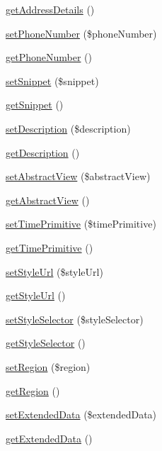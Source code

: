 \begin{DoxyCompactItemize}
\item 
\hyperlink{classFeature_af1d451696fc5849c4a76ad583b6774c7}{getAddressDetails} ()
\item 
\hyperlink{classFeature_a25bd3bce01d5d4a5de52140bf21b6598}{setPhoneNumber} (\$phoneNumber)
\item 
\hyperlink{classFeature_ab3231780035528bf1f5d7a045f7a96e2}{getPhoneNumber} ()
\item 
\hyperlink{classFeature_ae4eab7a245ddbe6af1308a4887cd33ea}{setSnippet} (\$snippet)
\item 
\hyperlink{classFeature_a0b572f137dd3c6b2eeabcc09f0058848}{getSnippet} ()
\item 
\hyperlink{classFeature_a15e69cacfe59295974cf7bda19eb3052}{setDescription} (\$description)
\item 
\hyperlink{classFeature_a72e22a8b110daba84cab1e06ff69da73}{getDescription} ()
\item 
\hyperlink{classFeature_a2a972193bb4117515513b30f99ce46ca}{setAbstractView} (\$abstractView)
\item 
\hyperlink{classFeature_a288e654dce20d49aa7d0dd59fae9eb28}{getAbstractView} ()
\item 
\hyperlink{classFeature_a379553d80ee9fce1742d89c6b6929b24}{setTimePrimitive} (\$timePrimitive)
\item 
\hyperlink{classFeature_a415c99cc750f96183bdfeae7b245b4c7}{getTimePrimitive} ()
\item 
\hyperlink{classFeature_a192d44bc9a22166cc2288dd7b45a30fb}{setStyleUrl} (\$styleUrl)
\item 
\hyperlink{classFeature_ad322275fe20abaa64fa6d33d2fa5664f}{getStyleUrl} ()
\item 
\hyperlink{classFeature_a81d9281a82c1a8d5b24d549da9f6bb3e}{setStyleSelector} (\$styleSelector)
\item 
\hyperlink{classFeature_af7b0b42e5dd5a2b0257bc7cfb4d18a72}{getStyleSelector} ()
\item 
\hyperlink{classFeature_a5004dec02433339ca95a9728c0d22df3}{setRegion} (\$region)
\item 
\hyperlink{classFeature_ae49a1ed973ae503b4c413e78a3708234}{getRegion} ()
\item 
\hyperlink{classFeature_ac13c5fe723c718c860bcf4216adad6e3}{setExtendedData} (\$extendedData)
\item 
\hyperlink{classFeature_a0f51fb450704f4f92c8b840fe5aabc2e}{getExtendedData} ()
\end{DoxyCompactItemize}
